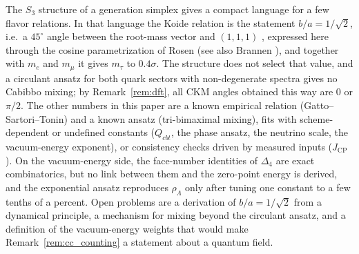 \documentclass[11pt,reqno]{amsart}
\theoremstyle{definition}
\begin{document}
The $S_3$ structure of a generation simplex gives a compact language for a few flavor relations. In that language the Koide relation is the statement $b/a = 1/\sqrt2$, i.e.\ a $45^\circ$ angle between the root-mass vector and $(1,1,1)$ \cite{foot1994note}, expressed here through the cosine parametrization of Rosen \cite{rosen2007heuristic} (see also Brannen \cite{brannen2010spin}), and together with $m_e$ and $m_\mu$ it gives $m_\tau$ to $0.4\sigma$. The structure does not select that value, and a circulant ansatz for both quark sectors with non-degenerate spectra gives no Cabibbo mixing; by Remark~\ref{rem:dft}, all CKM angles obtained this way are $0$ or $\pi/2$. The other numbers in this paper are a known empirical relation (Gatto--Sartori--Tonin) and a known ansatz (tri-bimaximal mixing), fits with scheme-dependent or undefined constants ($Q_{cbt}$, the phase ansatz, the neutrino scale, the vacuum-energy exponent), or consistency checks driven by measured inputs ($J_{\mathrm{CP}}$). On the vacuum-energy side, the face-number identities of $\Delta_4$ are exact combinatorics, but no link between them and the zero-point energy is derived, and the exponential ansatz reproduces $\rho_\Lambda$ only after tuning one constant to a few tenths of a percent. Open problems are a derivation of $b/a = 1/\sqrt2$ from a dynamical principle, a mechanism for mixing beyond the circulant ansatz, and a definition of the vacuum-energy weights that would make Remark~\ref{rem:cc_counting} a statement about a quantum field.

\end{document}

